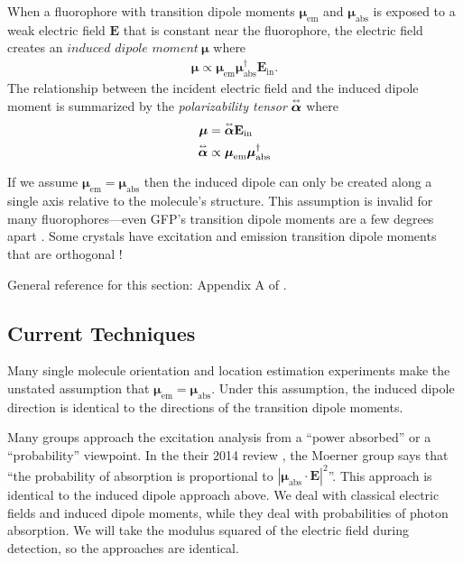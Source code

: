\documentclass[11pt]{article}
\providecommand{\mb}[1]{\mathbf{#1}}
\providecommand{\bs}[1]{\boldsymbol{#1}}
\newcommand{\tensor}[1]{\overset{\text{\tiny$\leftrightarrow$}}{\mb{#1}}}
\begin{document}
When a fluorophore with transition dipole moments $\bs{\mu}_{\text{em}}$ and
$\bs{\mu}_{\text{abs}}$ is exposed to a weak electric field $\mb{E}$ that is
constant near the fluorophore, the electric field creates an
$\textit{induced dipole moment}$$\ \bs{\mu}$ where
\begin{align*}
  \bs{\mu} \propto \bs{\mu}_{\text{em}}\bs{\mu}_{\text{abs}}^{\dagger}\mb{E}_{\text{in}}. 
\end{align*}
The relationship between the incident electric field and the induced dipole
moment is summarized by the \textit{polarizability tensor}
$\tensor{\bs{\alpha}}$ where
\begin{align*}
  \bs{\mu} &= \tensor{\bs{\alpha}}\mb{E}_{\text{in}}\\
  \tensor{\bs{\alpha}} &\propto \bs{\mu}_{\text{em}}\bs{\mu}_{\text{abs}}^{\dagger}
\end{align*}

If we assume $\bs{\mu}_{\text{em}}
=\bs{\mu}_{\text{abs}}$ then the induced dipole can only be created along a
single axis relative to the molecule's structure. This assumption is invalid for
many fluorophores---even GFP's transition dipole moments are a few degrees apart
\cite{rosell2003}. Some crystals have excitation and emission transition dipole
moments that are orthogonal \cite{koberling}!

General reference for this section: Appendix A of \cite{nov}.

\subsection{Current Techniques}
Many single molecule orientation and location estimation experiments make the
unstated assumption that $\bs{\mu}_{\text{em}} =\bs{\mu}_{\text{abs}}$. Under
this assumption, the induced dipole direction is identical to the directions of
the transition dipole moments. 


Many groups approach the excitation analysis from a ``power absorbed'' or a
``probability'' viewpoint. In the their 2014 review \cite{backer}, the Moerner
group says that ``the probability of absorption is proportional to
$|\bs{\mu}_{\text{abs}}\cdot\mb{E}|^2$''. This approach is identical to the
induced dipole approach above. We deal with classical electric fields and
induced dipole moments, while they deal with probabilities of photon absorption. We
will take the modulus squared of the electric field during detection, so the
approaches are identical. 
\end{document}
